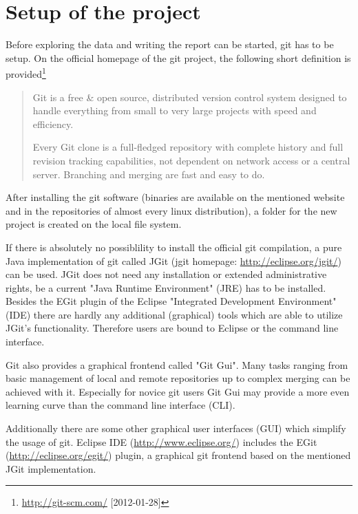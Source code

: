 \documentclass{ifacconf}
\begin{document}
\section{Setup of the project}

Before exploring the data and writing the report can be started, git has to be setup.
On the official homepage of the git project, the following short definition 
is provided\footnote{\url{http://git-scm.com/} [2012-01-28]}

\begin{quotation}
Git is a free \& open source, distributed version control 
system designed to handle everything from small to very large projects with speed and efficiency.

Every Git clone is a full-fledged repository with complete 
history and full revision tracking capabilities, not 
dependent on network access or a central server. Branching and merging are fast and easy to do.
\end{quotation}

After installing the git software (binaries are available on the mentioned website and in 
the repositories of almost every linux distribution), a folder for the new project is 
created on the local file system. 

If there is absolutely no possiblility to install
the official git compilation, a pure Java implementation of git called JGit (jgit homepage: 
\url{http://eclipse.org/jgit/}) can be used. JGit does not need any installation or
extended administrative rights, be a current "Java Runtime Environment" (JRE) has
to be installed. Besides the EGit plugin of the Eclipse "Integrated Development 
Environment" (IDE) there are hardly any additional (graphical) tools which are able
to utilize JGit's functionality. Therefore users are bound to Eclipse or the 
command line interface.

Git also provides a graphical frontend called "Git Gui". Many tasks ranging from
basic management of local and remote repositories up to complex merging can be
achieved with it. Especially for novice git users Git Gui may provide a more even
learning curve than the command line interface (CLI).

Additionally there are some other graphical user interfaces (GUI) which
simplify the usage of git. Eclipse IDE (\url{http://www.eclipse.org/}) includes the EGit
(\url{http://eclipse.org/egit/}) plugin, a graphical git frontend based on
the mentioned JGit implementation. 
\end{document}
